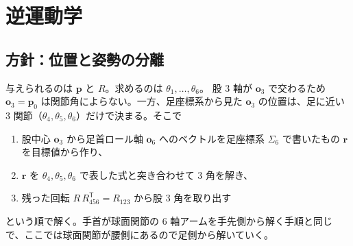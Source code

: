 \documentclass[a4paper,11pt]{ltjsarticle}
\newcommand{\bp}{\boldsymbol{p}}\newcommand{\bo}{\boldsymbol{o}}\newcommand{\br}{\boldsymbol{r}}
\newcommand{\T}{^{\mathsf T}}
\begin{document}
\section{逆運動学}

\subsection{方針：位置と姿勢の分離}\label{sec:ik-policy}
与えられるのは $\bp$ と $R$。求めるのは $\theta_1,\dots,\theta_6$。
股 3 軸が $\bo_3$ で交わるため $\bo_3=\bp_0$ は関節角によらない。一方、足座標系から見た $\bo_3$ の位置は、足に近い 3 関節（$\theta_4,\theta_5,\theta_6$）だけで決まる。そこで
\begin{enumerate}
\item 股中心 $\bo_3$ から足首ロール軸 $\bo_6$ へのベクトルを足座標系 $\Sigma_6$ で書いたもの $\br$ を目標値から作り、
\item $\br$ を $\theta_4,\theta_5,\theta_6$ で表した式と突き合わせて 3 角を解き、
\item 残った回転 $R\,R_{456}\T=R_{123}$ から股 3 角を取り出す
\end{enumerate}
という順で解く。手首が球面関節の 6 軸アームを手先側から解く手順と同じで、ここでは球面関節が腰側にあるので足側から解いていく。
\end{document}
